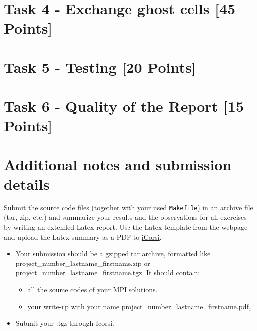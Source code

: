 \documentclass[unicode,11pt,a4paper,oneside,numbers=endperiod,openany]{scrartcl}
\begin{document}
\section{Task 4 - Exchange ghost cells [45 Points] }



\section{Task 5 - Testing [20 Points]  }



\section{Task 6 - Quality of the Report   [15 Points]}



\section*{Additional notes and submission details}
Submit the source code files (together with your used \texttt{Makefile}) in
an archive file (tar, zip, etc.) and summarize your results and the
observations for all exercises by writing an extended Latex report.
Use the Latex template from the webpage and upload the Latex summary
as a PDF to \href{https://www.icorsi.ch/course/view.php?id=14652}{iCorsi}.

\begin{itemize}
\item Your submission should be a gzipped tar archive, formatted like project\_number\_lastname\_firstname.zip or project\_number\_lastname\_firstname.tgz. 
      It should contain:
  \begin{itemize}
    \item all the source codes of your MPI solutions.
    \item your write-up with your name  project\_number\_lastname\_firstname.pdf, 
  \end{itemize}
   \item Submit your .tgz through Icorsi.
  \end{itemize}
\end{document}
